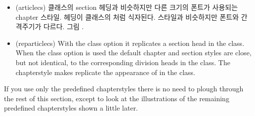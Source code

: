 \begin{itemize}
\item[\cstyle{article}]
\glossary(articlecs)%
  {}%
  { 클래스의 section 헤딩과 비슷하지만 다른 크기의 폰트가 사용되는 chapter 스타일.}
헤딩이  클래스의 \cmd{\section}처럼 식자된다.
 스타일과 비슷하지만 폰트와 간격주기가 다르다. 그림 .

\item[\cstyle{reparticle}]
\glossary(reparticlecs)%
  {}%
  {With the  class option it replicates a section head in 
   the  class.}
   When the  class option is used
    the default chapter and section styles are close, but not
    identical, to the corresponding division heads in the 
    class. The  chapterstyle makes \cmd{\chapter}
    replicate the appearance of \cmd{\section} in the 
    class.

\end{itemize}

    If you use only the predefined chapterstyles there is no need to
plough through the rest of this section, except to look at the illustrations
of the remaining predefined chapterstyles shown a little later.

